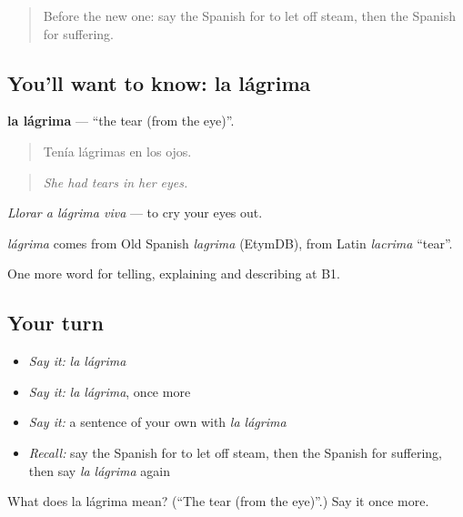 \label{lesson:ES-C717-lagrima}



\begin{quote}
Before the new one: say the Spanish for to let off steam, then the Spanish for suffering.
\end{quote}

\subsection*{You'll want to know: la lágrima}
\textbf{la lágrima} — \textquotedblleft{}the tear (from the eye)\textquotedblright{}.

\begin{quote}
Tenía lágrimas en los ojos.
\end{quote}

\begin{quote}
\emph{She had tears in her eyes.}
\end{quote}

\emph{Llorar a lágrima viva} — to cry your eyes out.

\begin{cousinweb}
\emph{lágrima} comes from Old Spanish \emph{lagrima} (EtymDB), from Latin \emph{lacrima} \textquotedblleft{}tear\textquotedblright{}.
\end{cousinweb}

\begin{grammarlens}[title={What you've built}]
One more word for telling, explaining and describing at B1.
\end{grammarlens}

\subsection*{Your turn}
\begin{itemize}
\raggedright
  \item \emph{Say it:} \emph{la lágrima}
  \item \emph{Say it:} \emph{la lágrima}, once more
  \item \emph{Say it:} a sentence of your own with \emph{la lágrima}
  \item \emph{Recall:} say the Spanish for to let off steam, then the Spanish for suffering, then say \emph{la lágrima} again
\end{itemize}

\begin{tcolorbox}[breakable,colback=teal!4,colframe=teal!35!black,title={Before you move on}]
What does la lágrima mean? (\textquotedblleft{}The tear (from the eye)\textquotedblright{}.) Say it once more.
\end{tcolorbox}
